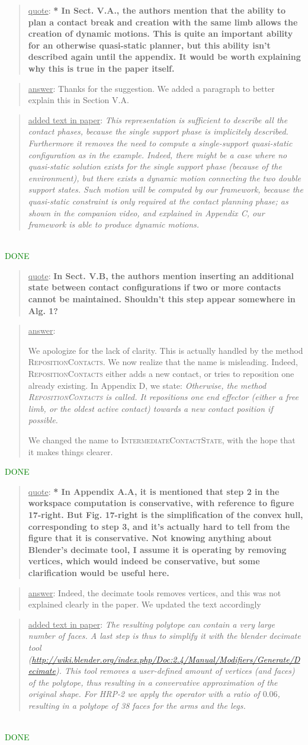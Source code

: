 \documentclass[a4paper]{article}
\newcommand{\done}[0]{\textcolor{green}{DONE}}
\newcommand\quot[1]{\begin{quote} \underline{quote}: \textbf{#1}\end{quote}}
\newcommand\as[1]{\begin{quote} \underline{answer}: {#1}\end{quote} }
\newcommand\qt[1]{\begin{quote} \underline{added text in paper}: \textit{#1}\end{quote} \leavevmode \\ }
\begin{document}
\quot{* In Sect. V.A., the authors mention that the ability to plan a contact
break and creation with the same limb allows the creation of dynamic
motions. This is quite an important ability for an otherwise
quasi-static planner, but this ability isn't described again until the
appendix. It would be worth explaining why this is true in the paper
itself. }
\as{Thanks for the suggestion. We added a paragraph to better explain this in Section V.A.}
\qt{This representation is sufficient to describe all the contact phases, because the single support phase is implicitely described. Furthermore it removes the need to compute a single-support quasi-static configuration as in the example. Indeed, there might be a case where no quasi-static solution exists for the single support phase (because of the environment), but
there exists a dynamic motion connecting the two double support states. Such motion will be computed by our framework, because the quasi-static constraint is only required at the contact planning phase; as shown in the companion video, and explained in Appendix C, our framework is able to produce dynamic motions.
}
\done

\quot{In Sect. V.B, the authors mention inserting an additional state
between contact configurations if two or more contacts cannot be
maintained. Shouldn't this step appear somewhere in Alg. 1?}
\as{We apologize for the lack of clarity. This is actually handled by the method \textsc{RepositionContacts}. We now realize that the name is misleading. Indeed,
\textsc{RepositionContacts} either adds a new contact, or tries to reposition one already existing. In Appendix D, we state:
\textit{Otherwise, the method \textsc{RepositionContacts} is called. It repositions one end effector (either a free
limb, or the oldest active contact) towards a new contact
position if possible. }

We changed the name to \textsc{IntermediateContactState}, with the hope that it makes things clearer.}\done

\quot{* In Appendix A.A, it is mentioned that step 2 in the workspace
computation is conservative, with reference to figure 17-right. But
Fig. 17-right is the simplification of the convex hull, corresponding
to step 3, and it's actually hard to tell from the figure that it is
conservative. Not knowing anything about Blender's decimate tool, I
assume it is operating by removing vertices, which would indeed be
conservative, but some clarification would be useful here.}
\as{Indeed, the decimate tools removes vertices, and this was not explained clearly in the paper. We updated the text accordingly}
\qt{The resulting polytope can contain a very large number of faces. A last step is thus to simplify it with the blender decimate tool (\url{http://wiki.blender.org/index.php/Doc:2.4/Manual/Modifiers/Generate/Decimate}). This tool removes a user-defined amount of vertices (and faces) of the polytope, thus resulting
in a convervative approximation of the original shape. For HRP-2 we apply the operator with a ratio of $0.06$, resulting in a polytope of 38 faces for the arms and the legs.}\done
\end{document}
